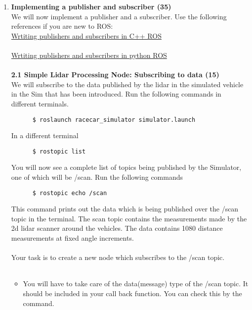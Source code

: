 \documentclass[letta4 paper]{article}
\begin{document}
\begin{enumerate}
    \item \textbf{Implementing a publisher and subscriber (35)}\\
    We will now implement a publisher and a subscriber. Use the following references if you are new to ROS: \\
    
    \href{http://wiki.ros.org/ROS/Tutorials/WritingPublisherSubscriber%28c%2B%2B%29}{Wrtiting publishers and subscribers in C++ ROS}\\
    \\
    \href{http://wiki.ros.org/ROS/Tutorials/WritingPublisherSubscriber%28python%29}{Wrtiting publishers and subscribers in python ROS}\\
    \\
    \textbf{2.1 Simple Lidar Processing Node: Subscribing to data (15)}\\
    We will subscribe to the data published by the lidar in the simulated vehicle in the Sim that has been introduced. Run the following commands in different terminals. 
    \begin{lstlisting}
      $ roslaunch racecar_simulator simulator.launch
    \end{lstlisting}{}
    In a different terminal
    \begin{lstlisting}
      $ rostopic list
    \end{lstlisting}{}
    You will now see a complete list of topics being published by the Simulator, one of which will be /scan. Run the following commands\\
    \begin{lstlisting}
      $ rostopic echo /scan
    \end{lstlisting}{} 
    This command prints out the data which is being published over the /scan topic in the terminal. The scan topic contains the measurements made by the 2d lidar scanner around the vehicles. The data contains 1080 distance measurements at fixed angle increments. 
    \\
    \\
    Your task is to create a new node which subscribes to the /scan topic.\\
    \\
    \begin{itemize}
        \item You will have to take care of the data(message) type of the /scan topic. It should be included in your call back function. You can check this by the command. \\
        \begin{lstlisting}

\end{lstlisting}
\end{itemize}
\end{enumerate}
\end{document}
